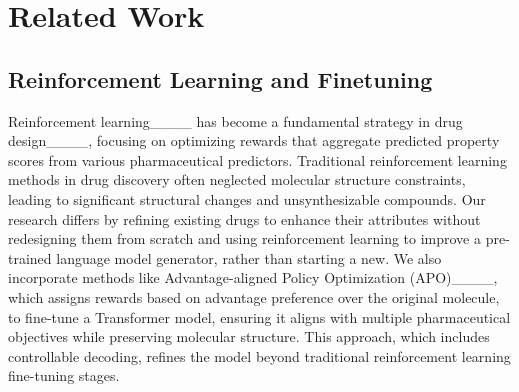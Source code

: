 \section{Related Work}
\label{sec:related}





































\subsection{Reinforcement Learning and Finetuning}





Reinforcement learning____  has become a fundamental strategy in drug design____, focusing on optimizing rewards that aggregate predicted property scores from various pharmaceutical predictors. Traditional reinforcement learning methods in drug discovery often neglected molecular structure constraints, leading to significant structural changes and unsynthesizable compounds. Our research differs by refining existing drugs to enhance their attributes without redesigning them from scratch and using reinforcement learning to improve a pre-trained language model generator, rather than starting a new. We also incorporate methods like Advantage-aligned Policy Optimization (APO)____, which assigns rewards based on advantage preference over the original molecule, to fine-tune a Transformer model, ensuring it aligns with multiple pharmaceutical objectives while preserving molecular structure. This approach, which includes controllable decoding, refines the model beyond traditional reinforcement learning fine-tuning stages.

























